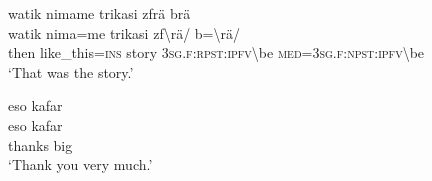 \ea\label{ex:13:a1456}
watik nimame trikasi zfrä brä\\
\gll watik	nima=me	trikasi	zf{\textbackslash}rä/	b={\textbackslash}rä/\\
     then	like\_this=\textsc{ins}	story	3\textsc{sg}.\textsc{f}:\textsc{rpst}:\textsc{ipfv}{\textbackslash}be	\textsc{med}=3\textsc{sg}.\textsc{f}:\textsc{npst}:\textsc{ipfv}{\textbackslash}be\\
\glt `That was the story.'
\z

\ea\label{ex:13:a1457}
eso kafar\\
\gll eso	kafar\\
     thanks	big\\
\glt `Thank you very much.'
\z
